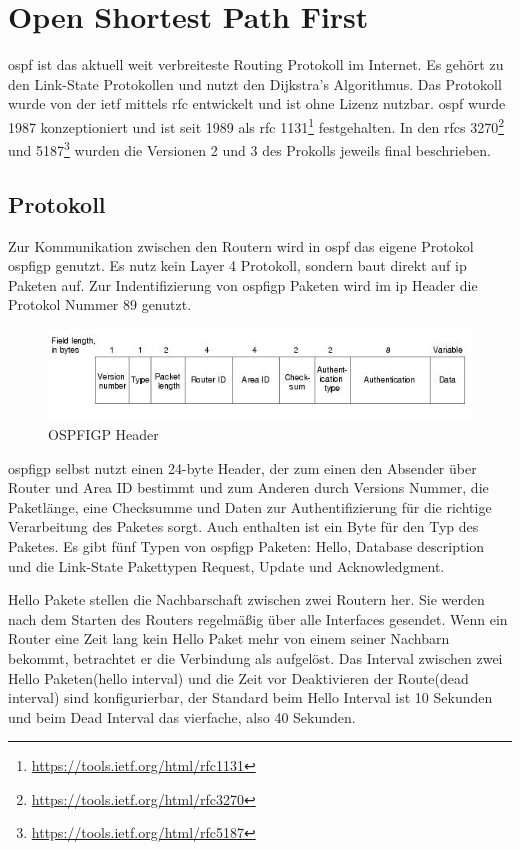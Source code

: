 \documentclass[11pt,a4paper,final]{article}
\begin{document}
\section{Open Shortest Path First}
\ac{ospf} ist das aktuell weit verbreiteste Routing Protokoll im Internet.
Es gehört zu den Link-State Protokollen und nutzt den Dijkstra's Algorithmus.
Das Protokoll wurde von der \ac{ietf} mittels \ac{rfc} entwickelt und ist ohne Lizenz nutzbar.
\ac{ospf} wurde 1987 konzeptioniert und ist seit 1989 als \ac{rfc} 1131\footnote{\url{https://tools.ietf.org/html/rfc1131}} festgehalten.
In den \ac{rfc}s 3270\footnote{\url{https://tools.ietf.org/html/rfc3270}} und 5187\footnote{\url{https://tools.ietf.org/html/rfc5187}} wurden die Versionen 2 und 3 des Prokolls jeweils final beschrieben.
\citep{weOSPF}
\subsection{Protokoll}
Zur Kommunikation zwischen den Routern wird in \ac{ospf} das eigene Protokol \ac{ospfigp} genutzt. Es nutz kein Layer 4 Protokoll, sondern baut direkt auf \ac{ip} Paketen auf. Zur Indentifizierung von \ac{ospfigp} Paketen wird im \ac{ip} Header die Protokol Nummer 89 genutzt.\citep{ianaProtNr}
\begin{figure}[H]
\includegraphics[width=1.0\textwidth]{images/ospf_igp_header.jpg}
\caption[OSPFIGP header]{OSPFIGP Header\footnotemark}
\label{fig:ospfigp-header}
\end{figure}
\ac{ospfigp} selbst nutzt einen 24-byte Header, der zum einen den Absender über Router und Area ID bestimmt und zum Anderen durch Versions Nummer, die Paketlänge, eine Checksumme und Daten zur Authentifizierung für die richtige Verarbeitung des Paketes sorgt.
Auch enthalten ist ein Byte für den Typ des Paketes. Es gibt fünf Typen von \ac{ospfigp} Paketen: Hello, Database description und die Link-State Pakettypen Request, Update und Acknowledgment. \citep{ciscoDocWikiOSPF}

Hello Pakete stellen die Nachbarschaft zwischen zwei Routern her. Sie werden nach dem Starten des Routers regelmäßig über alle Interfaces gesendet. Wenn ein Router eine Zeit lang kein Hello Paket mehr von einem seiner Nachbarn bekommt, betrachtet er die Verbindung als aufgelöst.\citep{weOSPF} Das Interval zwischen zwei Hello Paketen(hello interval) und die Zeit vor Deaktivieren der Route(dead interval) sind konfigurierbar, der Standard beim Hello Interval ist 10 Sekunden und beim Dead Interval das vierfache, also 40 Sekunden.\citep{KarlSolie2001}
\end{document}
